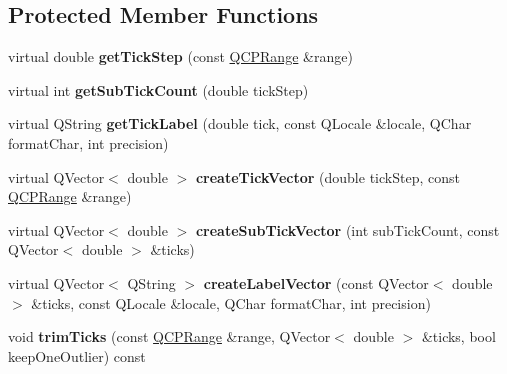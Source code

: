 \subsection*{Protected Member Functions}
\begin{DoxyCompactItemize}
\item 
\mbox{\label{class_q_c_p_axis_ticker_a910d69bcec2de37e92d8d4e1ecf201e2}} 
virtual double {\bfseries get\+Tick\+Step} (const \mbox{\hyperlink{class_q_c_p_range}{Q\+C\+P\+Range}} \&range)
\item 
\mbox{\label{class_q_c_p_axis_ticker_a4ccc403ced7a1457ce6ba293509933c8}} 
virtual int {\bfseries get\+Sub\+Tick\+Count} (double tick\+Step)
\item 
\mbox{\label{class_q_c_p_axis_ticker_a8201eb4aa8be192bf786b126eb5ee089}} 
virtual Q\+String {\bfseries get\+Tick\+Label} (double tick, const Q\+Locale \&locale, Q\+Char format\+Char, int precision)
\item 
\mbox{\label{class_q_c_p_axis_ticker_af4645a824c7bd2ca8fc7e86ebf9055bd}} 
virtual Q\+Vector$<$ double $>$ {\bfseries create\+Tick\+Vector} (double tick\+Step, const \mbox{\hyperlink{class_q_c_p_range}{Q\+C\+P\+Range}} \&range)
\item 
\mbox{\label{class_q_c_p_axis_ticker_a9a6435723fa0bd366d1ea4c2cff7c33f}} 
virtual Q\+Vector$<$ double $>$ {\bfseries create\+Sub\+Tick\+Vector} (int sub\+Tick\+Count, const Q\+Vector$<$ double $>$ \&ticks)
\item 
\mbox{\label{class_q_c_p_axis_ticker_a804050e408f37a0b9770c6654ebe6aa7}} 
virtual Q\+Vector$<$ Q\+String $>$ {\bfseries create\+Label\+Vector} (const Q\+Vector$<$ double $>$ \&ticks, const Q\+Locale \&locale, Q\+Char format\+Char, int precision)
\item 
\mbox{\label{class_q_c_p_axis_ticker_ab28cc1ab549489be7975f5ce7e717916}} 
void {\bfseries trim\+Ticks} (const \mbox{\hyperlink{class_q_c_p_range}{Q\+C\+P\+Range}} \&range, Q\+Vector$<$ double $>$ \&ticks, bool keep\+One\+Outlier) const
\item 
\mbox{\label{class_q_c_p_axis_ticker_a4ea0a7c4ca1c610f92b9bd5944ab4260}} 

\end{DoxyCompactItemize}
